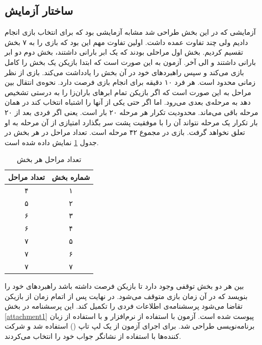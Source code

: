 \documentclass[twoside, a4paper,11pt]{book}
\numberwithin{equation}{chapter}
\numberwithin{table}{chapter}
\numberwithin{figure}{chapter}
\numberwithin{equation}{chapter}
\begin{document}
\subsection{ساختار آزمایش}
آزمایشی که در این بخش طراحی شد مشابه آزمایشی بود که برای انتخاب بازی انجام دادیم ولی چند تفاوت عمده داشت. اولین تفاوت مهم این بود که بازی را به ۷ بخش تقسیم کردیم. بخش اول مراحلی بودند که یک ابر بارانی داشتند، بخش دوم دو ابر بارانی داشتند و الی آخر. آزمون به این صورت است که ابتدا بازیکن یک بخش را کامل بازی می‌کند و سپس راهبرد‌های خود در آن بخش را یادداشت می‌کند. بازی از نظر زمانی محدود است. هر فرد ۱۰ دقیقه برای انجام بازی فرصت دارد. نحوه‌ی انتقال بین مراحل به این صورت است که اگر بازیکن تمام ابرهای باران‌زا را به درستی تشخیص دهد به مرحله‌ی بعدی می‌رود. اما اگر حتی یکی از آنها را اشتباه انتخاب کند در همان مرحله باقی می‌ماند. محدودیت تکرار هر مرحله ۲۰ بار است. یعنی اگر فردی بعد از ۲۰ بار تکرار یک مرحله نتواند آن را با موفقیت پشت سر بگذارد امتیازی از آن مرحله به او تعلق نخواهد گرفت. بازی در مجموع ۴۲ مرحله است. تعداد مراحل در هر بخش در جدول \ref{numOfLevelTable} نمایش داده شده است.

\begin{table}[]
\centering
\caption{تعداد مراحل هر بخش}
\label{numOfLevelTable}
\begin{tabular}{|c|c|}
\hline
\textbf{تعداد مراحل} & \textbf{شماره بخش} \\ \hline
۴                    & ۱                  \\ \hline
۵                    & ۲                  \\ \hline
۶                    & ۳                  \\ \hline
۶                    & ۴                  \\ \hline
۷                    & ۵                  \\ \hline
۷                    & ۶                  \\ \hline
۷                    & ۷                  \\ \hline
\end{tabular}
\end{table}


بین هر دو بخش توقفی وجود دارد تا بازیکن فرصت داشته باشد راهبرد‌های خود را بنویسد که در آن زمان بازی متوقف می‌شود. در نهایت پس از اتمام زمان از بازیکن تقاضا می‌شود پرسشنامه‌ی اطلاعات فردی را تکمیل کند. این پرسشنامه در بخش \ref{attachment1} پیوست شده است.
آزمون با استفاده از نرم‌افزار  و با استفاده از زبان برنامه‌نویسی   طراحی شد. برای اجرای آزمون از یک لپ تاپ () استفاده شد و شرکت کننده‌ها با استفاده از نشانگر جواب خود را انتخاب می‌کردند.
\end{document}
